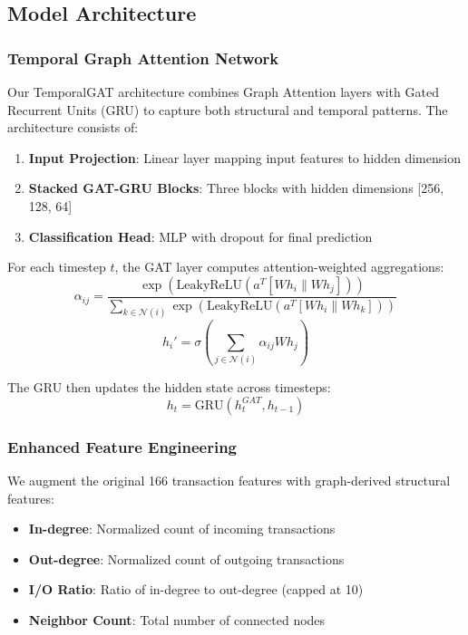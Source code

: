 \documentclass[12pt,a4paper]{article}
\begin{document}
\subsection{Model Architecture}

\subsubsection{Temporal Graph Attention Network}
Our TemporalGAT architecture combines Graph Attention layers with Gated Recurrent Units (GRU) to capture both structural and temporal patterns. The architecture consists of:

\begin{enumerate}
    \item \textbf{Input Projection}: Linear layer mapping input features to hidden dimension
    \item \textbf{Stacked GAT-GRU Blocks}: Three blocks with hidden dimensions [256, 128, 64]
    \item \textbf{Classification Head}: MLP with dropout for final prediction
\end{enumerate}

For each timestep $t$, the GAT layer computes attention-weighted aggregations:
\begin{equation}
    \alpha_{ij} = \frac{\exp(\text{LeakyReLU}(a^T[Wh_i \| Wh_j]))}{\sum_{k \in \mathcal{N}(i)} \exp(\text{LeakyReLU}(a^T[Wh_i \| Wh_k]))}
\end{equation}
\begin{equation}
    h_i' = \sigma\left(\sum_{j \in \mathcal{N}(i)} \alpha_{ij} W h_j\right)
\end{equation}

The GRU then updates the hidden state across timesteps:
\begin{equation}
    h_t = \text{GRU}(h_t^{GAT}, h_{t-1})
\end{equation}

\subsubsection{Enhanced Feature Engineering}
We augment the original 166 transaction features with graph-derived structural features:
\begin{itemize}
    \item \textbf{In-degree}: Normalized count of incoming transactions
    \item \textbf{Out-degree}: Normalized count of outgoing transactions
    \item \textbf{I/O Ratio}: Ratio of in-degree to out-degree (capped at 10)
    \item \textbf{Neighbor Count}: Total number of connected nodes
\end{itemize}
\end{document}
